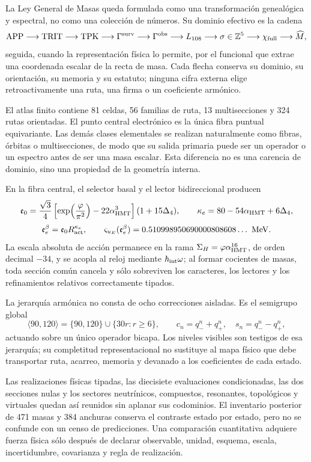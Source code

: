 La Ley General de Masas queda formulada como una transformación genealógica y
espectral, no como una colección de números. Su dominio efectivo es la cadena
\[
\text{APP}\longrightarrow\text{TRIT}\longrightarrow\text{TPK}
\longrightarrow\Gamma^{\rm surv}\longrightarrow\Gamma^{\rm obs}
\longrightarrow L_{108}\longrightarrow\sigma\in\mathbb Z^5
\longrightarrow\chi_{\rm full}\longrightarrow\widehat M,
\]
seguida, cuando la representación física lo permite, por el funcional que
extrae una coordenada escalar de la recta de masa. Cada flecha conserva su
dominio, su orientación, su memoria y su estatuto; ninguna cifra externa elige
retroactivamente una ruta, una firma o un coeficiente armónico.

El atlas finito contiene 81 celdas, 56 familias de ruta, 13 multisecciones y
324 rutas orientadas. El punto central electrónico es la única fibra puntual
equivariante. Las demás clases elementales se realizan naturalmente como
fibras, órbitas o multisecciones, de modo que su salida primaria puede ser un
operador o un espectro antes de ser una masa escalar. Esta diferencia no es una
carencia de dominio, sino una propiedad de la geometría interna.

En la fibra central, el selector basal y el lector bidireccional producen
\[
\mathfrak e_0
=\frac{\sqrt3}{4}
 \left[\exp\!\left(\frac{\varphi}{\pi^2}\right)
       -22\alpha_{\rm HMT}^3\right](1+15\Delta_4),
\qquad
\kappa_e=80-54\alpha_{\rm HMT}+6\Delta_4,
\]
\[
\mathfrak e_e^\beta=\mathfrak e_0R_{\rm act}^{\kappa_e},
\qquad
\varsigma_{u_E}(\mathfrak e_e^\beta)
=0.510998950690000808608\ldots\ \mathrm{MeV}.
\]
La escala absoluta de acción permanece en la rama
\(\Sigma_H=\varphi\alpha_{\rm HMT}^{16}\), de orden decimal \(-34\), y se
acopla al reloj mediante \(\hbar_{\rm int}\omega\); al formar cocientes de
masas, toda sección común cancela y sólo sobreviven los caracteres, los
lectores y los refinamientos relativos correctamente tipados.

La jerarquía armónica no consta de ocho correcciones aisladas. Es el semigrupo
global
\[
\langle90,120\rangle
=\{90,120\}\cup\{30r:r\ge6\},
\qquad
c_n=q_-^n+q_+^n,
\quad s_n=q_-^n-q_+^n,
\]
actuando sobre un único operador bicapa. Los niveles visibles son testigos de
esa jerarquía; su completitud representacional no sustituye al mapa físico que
debe transportar ruta, acarreo, memoria y devanado a los coeficientes de cada
estado.

Las realizaciones físicas tipadas, las diecisiete evaluaciones condicionadas, las
dos secciones nulas y los sectores neutrínicos, compuestos, resonantes,
topológicos y virtuales quedan así reunidos sin aplanar sus codominios. El
inventario posterior de 471 masas y 384 anchuras conserva el contraste
estado por estado, pero no se confunde con un censo de predicciones. Una
comparación cuantitativa adquiere fuerza física sólo después de declarar
observable, unidad, esquema, escala, incertidumbre, covarianza y regla de
realización.

